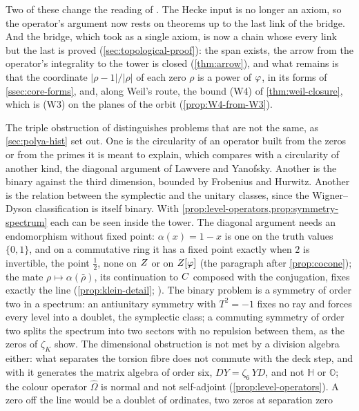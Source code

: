 Two of these change the reading of \cite{gonzalez25hp}.  The Hecke input is no longer
an axiom, so the operator's argument now rests on theorems up to the last link of the bridge.
And the bridge, which \cite{gonzalez25hp} took as a single axiom, is now a chain whose
every link but the last is proved (\cref{sec:topological-proof}): the span exists, the
arrow from the operator's integrality to the tower is closed (\cref{thm:arrow}), and
what remains is that the coordinate $|\rho-1|/|\rho|$ of each zero $\rho$ is a power of $\varphi$, in its forms of
\cref{ssec:core-forms}, and, along Weil's route, the bound (W4) of \cref{thm:weil-closure}, which is \textup{(W3)} on the
planes of the orbit (\cref{prop:W4-from-W3}).

The triple obstruction of \cite{gonzalez25hp} distinguishes problems that are not the same, as \cref{sec:polya-hist}
set out.  One is the circularity
of an operator built from the zeros or from the primes it is meant to explain, which \cite{gonzalez25hp} compares with a
circularity of another kind, the diagonal argument of Lawvere and Yanofsky.  Another is the binary against the third
dimension, bounded by Frobenius and Hurwitz.  Another is the relation between the symplectic and the unitary classes,
since the Wigner--Dyson classification is itself binary.  With \cref{prop:level-operators,prop:symmetry-spectrum}
each can be seen inside the tower.  The diagonal argument needs an endomorphism without fixed point: $\alpha(x)=1-x$ is one on the truth values
$\{0,1\}$, and on a commutative ring it has a fixed point exactly when $2$ is invertible, the point $\tfrac12$,
none on $Z$ or on $Z[\varphi]$ (the paragraph after \cref{prop:cocone}); the mate $\rho\mapsto\alpha(\bar\rho)$, its continuation
to $C$ composed with the conjugation, fixes exactly the line (\cref{prop:klein-detail};
).  The binary problem is a symmetry of order two in a spectrum: an antiunitary symmetry with $T^2=-1$ fixes no
ray and forces every level into a doublet, the
symplectic class; a commuting symmetry of order two splits the spectrum into two sectors with no repulsion between
them, as the zeros of $\zeta_K$ show.  The dimensional obstruction is not met by a division algebra either: what separates
the torsion fibre does not commute with the deck step, and with it generates the matrix algebra of order six,
$DY=\zeta_6\,YD$, and not $\mathbb H$ or $\mathbb O$; the colour operator $\hat\Omega$ is normal and not self-adjoint
(\cref{prop:level-operators}).  A zero off the line would be a doublet of ordinates, two zeros at separation zero
